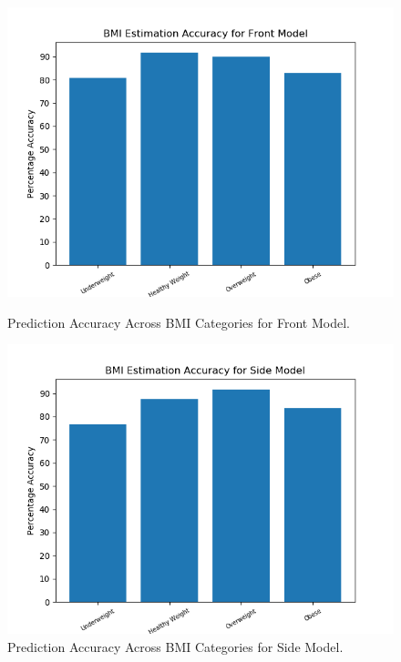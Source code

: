 \documentclass[conference]{IEEEtran}
\begin{document}
\begin{figure}[h]
    \centering
    \begin{minipage}[b]{0.3\textwidth}
    \includegraphics[width=\textwidth]{Front.png}
    \caption{Prediction Accuracy Across BMI Categories for Front Model.}
    \label{fig:frontaccuracy}
    \end{minipage}
    \hspace{1cm}
    \begin{minipage}[b]{0.3\textwidth}
    \includegraphics[width=\textwidth]{Side.png}
    \caption{Prediction Accuracy Across BMI Categories for Side Model.}
    \label{fig:sideaccuracy}
    \end{minipage}
\end{figure}
\end{document}
